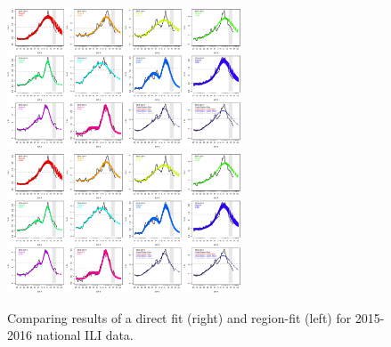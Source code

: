 \documentclass[a4paper]{article}
\begin{document}
\begin{figure}[hbtp]
  \centering
  \includegraphics[width=2.75in]{figures/US2015_region_fit.pdf}
  \hspace{0.1in}
  \includegraphics[width=2.75in]{figures/US2015_direct_fit.pdf}
  \caption{Comparing results of a direct fit (right) and region-fit (left) for 2015-2016 national ILI data.}
  \label{fig:nat_results}
\end{figure}
\end{document}
